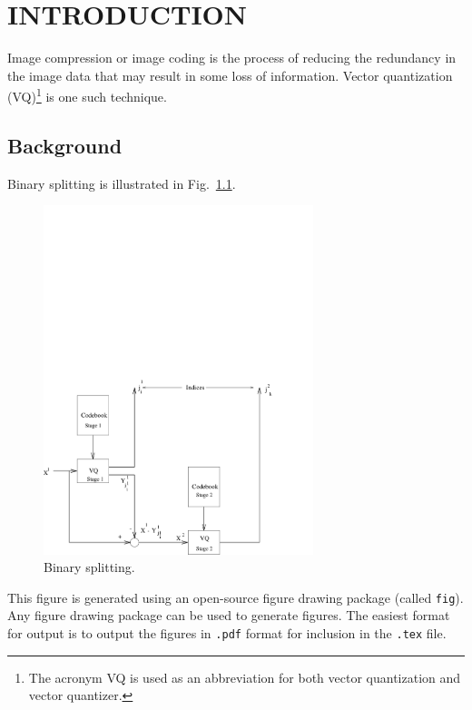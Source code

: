 %
%
%
%

\chapter{INTRODUCTION}
\thispagestyle{empty}

Image compression or image coding is the process of reducing the
redundancy in the image data that may result in some loss of
information.  Vector quantization (VQ)\footnote{The acronym VQ is used
  as an abbreviation for both vector quantization and vector
  quantizer.} is one such technique.

\section{Background}
Binary splitting is illustrated in Fig.~\ref{fig:split}.

\begin{figure}[htbp]
\centering
\includegraphics[width=0.7\textwidth]{samplefig}
\caption{Binary splitting.}
\label{fig:split}
\end{figure}
This figure is generated using an open-source figure drawing package
(called {\tt fig}).  Any figure drawing package can be used to
generate figures.  The easiest format for output is to output the
figures in {\tt .pdf} format for inclusion in the {\tt .tex} file.

